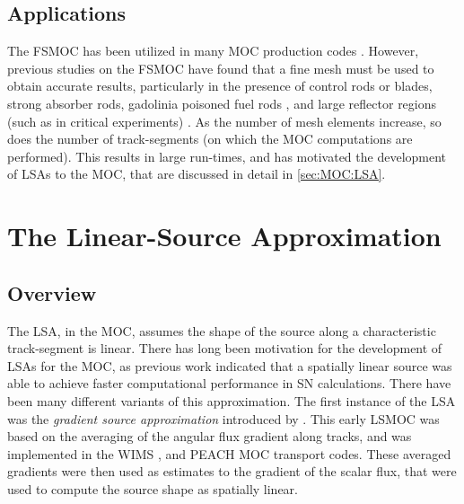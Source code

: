 {{        \subsection{Applications}{\label{ssec:FSA:Applications}
            The \ac{FSMOC} has been utilized in many \ac{MOC} production codes \cite{Halsall1980,Hong1998,Saji2000,Smith2002,Sugimura2006,Masiello2008,Boyd2014,Collins2016}.
            However, previous studies on the \ac{FSMOC} have found that a fine mesh must be used to obtain accurate results, particularly in the presence of control rods or blades, strong absorber rods, gadolinia poisoned fuel rods \cite{Petkov1999}, and large reflector regions (such as in critical experiments) \cite{Ferrer2016}.
            As the number of mesh elements increase, so does the number of track-segments (on which the \ac{MOC} computations are performed).
            This results in large run-times, and has motivated the development of \acfp{LSA} to the \ac{MOC}, that are discussed in detail in \cref{sec:MOC:LSA}.
        }
    }
    \section{The Linear-Source Approximation}{\label{sec:MOC:LSA}
        \subsection{Overview}{\label{ssec:MOC:LSA:Overview}
            The \acf{LSA}, in the \ac{MOC}, assumes the shape of the source along a characteristic track-segment is linear.
            There has long been motivation for the development of \acp{LSA} for the \ac{MOC}, as previous work \cite{Larsen1980} indicated that a spatially linear source was able to achieve faster computational performance in \ac{SN} calculations.
            There have been many different variants of this approximation.
            The first instance of the \ac{LSA} was the \emph{gradient source approximation} introduced by \citet{Halsall1993}.
            This early \ac{LSMOC} was based on the averaging of the angular flux gradient along tracks, and was implemented in the WIMS \cite{Halsall1993}, and PEACH \cite{Tang2009} \ac{MOC} transport codes.
            These averaged gradients were then used as estimates to the gradient of the scalar flux, that were used to compute the source shape as spatially linear.

}}}
